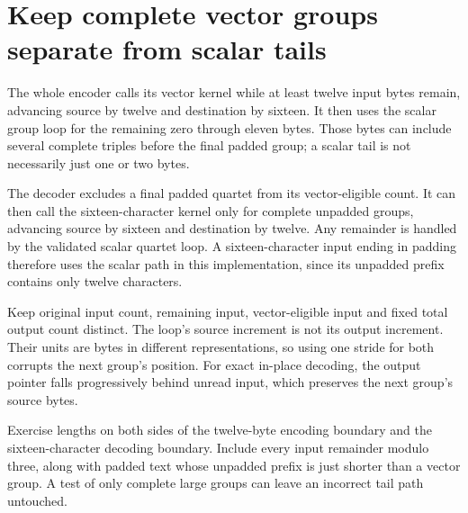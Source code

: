 \section{Keep complete vector groups separate from scalar tails}
The whole encoder calls its vector kernel while at least twelve input bytes remain,
advancing source by twelve and destination by sixteen. It then uses the scalar group
loop for the remaining zero through eleven bytes. Those bytes can include several
complete triples before the final padded group; a scalar tail is not necessarily just
one or two bytes.

The decoder excludes a final padded quartet from its vector-eligible count. It can then
call the sixteen-character kernel only for complete unpadded groups, advancing source
by sixteen and destination by twelve. Any remainder is handled by the validated scalar
quartet loop. A sixteen-character input ending in padding therefore uses the scalar
path in this implementation, since its unpadded prefix contains only twelve characters.

Keep original input count, remaining input, vector-eligible input and fixed total output
count distinct. The loop's source increment is not its output increment. Their units
are bytes in different representations, so using one stride for both corrupts the next
group's position. For exact in-place decoding, the output pointer falls progressively
behind unread input, which preserves the next group's source bytes.

Exercise lengths on both sides of the twelve-byte encoding boundary and the
sixteen-character decoding boundary. Include every input remainder modulo three,
along with padded text whose unpadded prefix is just shorter than a vector group.
A test of only complete large groups can leave an incorrect tail path untouched.
